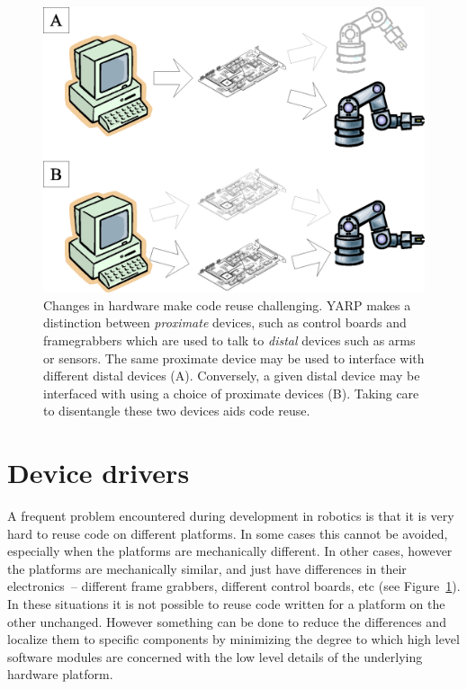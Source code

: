 \begin{figure}[t]
\centerline{\includegraphics[width=\columnwidth]{fig-devices}}
\caption{
Changes in hardware make code reuse challenging.
YARP makes a distinction between {\em proximate} devices,
such as control boards and framegrabbers which are used to
talk to {\em distal} devices such as arms or sensors.  The 
same proximate device may be used to interface with different
distal devices (A).   Conversely, a given distal device may be
interfaced with using a choice of proximate devices (B).
Taking care to disentangle these two devices aids code reuse.
}
\label{fig:devices}
\end{figure}

\section{Device drivers}

A frequent problem encountered during development in robotics is that
it is very hard to reuse code on different platforms. In some
cases this cannot be avoided, especially when the platforms are
mechanically different. In other cases, however the platforms are
mechanically similar, and just have differences in their 
electronics~-- different frame grabbers, different
control boards, etc (see Figure~\ref{fig:devices}). 
In these situations it is not possible to reuse code
written for a platform on the other unchanged. 
However something can be done to
reduce the differences and localize them to specific components
by minimizing the degree to which
high level software modules are 
concerned with the low level details of the underlying hardware
platform.

